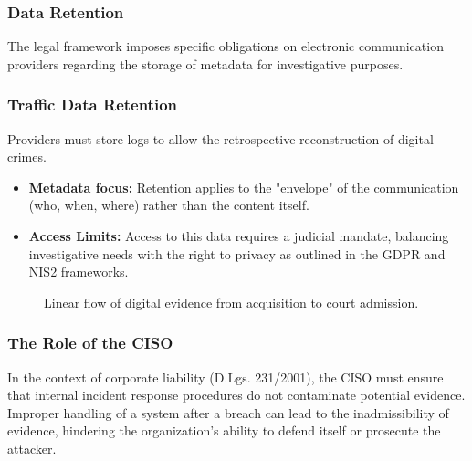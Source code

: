 \subsubsection{Data Retention}
The legal framework imposes specific obligations on electronic communication providers regarding the storage of metadata for investigative purposes.

\subsubsection*{Traffic Data Retention}
Providers must store logs to allow the retrospective reconstruction of digital crimes.
\begin{itemize}
    \item \textbf{Metadata focus:} Retention applies to the "envelope" of the communication (who, when, where) rather than the content itself.
    \item \textbf{Access Limits:} Access to this data requires a judicial mandate, balancing investigative needs with the right to privacy as outlined in the GDPR and NIS2 frameworks.
\end{itemize}

\begin{figure}[H]
\centering
{}
\caption{Linear flow of digital evidence from acquisition to court admission.}
\end{figure}

\subsubsection*{The Role of the CISO}
In the context of corporate liability (D.Lgs. 231/2001), the CISO must ensure that internal incident response procedures do not contaminate potential evidence. Improper handling of a system after a breach can lead to the inadmissibility of evidence, hindering the organization's ability to defend itself or prosecute the attacker.

